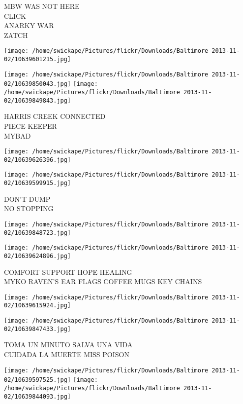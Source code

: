 \documentclass[10pt,letterpaper]{article}
\begin{document}
MBW WAS NOT HERE\\
CLICK\\
ANARKY WAR\\
ZATCH
\pagebreak

\texttt{[image: /home/swickape/Pictures/flickr/Downloads/Baltimore 2013-11-02/10639601215.jpg]}

\vspace{0.25in}
\texttt{[image: /home/swickape/Pictures/flickr/Downloads/Baltimore 2013-11-02/10639850043.jpg]}
\texttt{[image: /home/swickape/Pictures/flickr/Downloads/Baltimore 2013-11-02/10639849843.jpg]}

HARRIS CREEK CONNECTED\\
PIECE KEEPER\\
MYBAD
\pagebreak

\texttt{[image: /home/swickape/Pictures/flickr/Downloads/Baltimore 2013-11-02/10639626396.jpg]}

\vspace{0.25in}
\texttt{[image: /home/swickape/Pictures/flickr/Downloads/Baltimore 2013-11-02/10639599915.jpg]}

DON'T DUMP\\
NO STOPPING
\pagebreak

\texttt{[image: /home/swickape/Pictures/flickr/Downloads/Baltimore 2013-11-02/10639848723.jpg]}

\vspace{0.25in}
\texttt{[image: /home/swickape/Pictures/flickr/Downloads/Baltimore 2013-11-02/10639624896.jpg]}

COMFORT SUPPORT HOPE HEALING\\
MYKO RAVEN'S EAR FLAGS COFFEE MUGS KEY CHAINS
\pagebreak

\texttt{[image: /home/swickape/Pictures/flickr/Downloads/Baltimore 2013-11-02/10639615924.jpg]}

\vspace{0.25in}
\texttt{[image: /home/swickape/Pictures/flickr/Downloads/Baltimore 2013-11-02/10639847433.jpg]}

TOMA UN MINUTO SALVA UNA VIDA\\
CUIDADA LA MUERTE MISS POISON
\pagebreak

\texttt{[image: /home/swickape/Pictures/flickr/Downloads/Baltimore 2013-11-02/10639597525.jpg]}
\texttt{[image: /home/swickape/Pictures/flickr/Downloads/Baltimore 2013-11-02/10639844093.jpg]}
\end{document}
